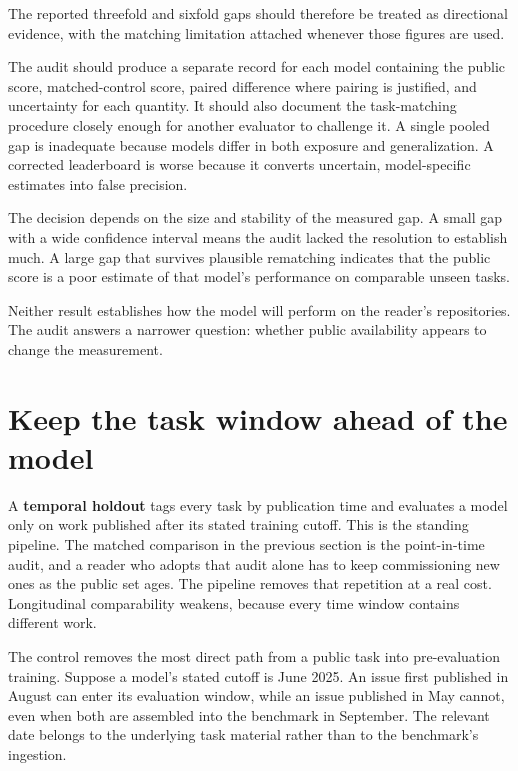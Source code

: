 The reported threefold and sixfold gaps should therefore be treated as directional evidence, with the matching limitation attached whenever those figures are used.

The audit should produce a separate record for each model containing the public score, matched-control score, paired difference where pairing is justified, and uncertainty for each quantity. It should also document the task-matching procedure closely enough for another evaluator to challenge it. A single pooled gap is inadequate because models differ in both exposure and generalization. A corrected leaderboard is worse because it converts uncertain, model-specific estimates into false precision.

The decision depends on the size and stability of the measured gap. A small gap with a wide confidence interval means the audit lacked the resolution to establish much. A large gap that survives plausible rematching indicates that the public score is a poor estimate of that model's performance on comparable unseen tasks.

Neither result establishes how the model will perform on the reader's repositories. The audit answers a narrower question: whether public availability appears to change the measurement.

\hypertarget{keep-the-task-window-ahead-of-the-model}{%
\section{Keep the task window ahead of the model}\label{keep-the-task-window-ahead-of-the-model}}

A \textbf{temporal holdout} tags every task by publication time and evaluates a model only on work published after its stated training cutoff. This is the standing pipeline. The matched comparison in the previous section is the point-in-time audit, and a reader who adopts that audit alone has to keep commissioning new ones as the public set ages. The pipeline removes that repetition at a real cost. Longitudinal comparability weakens, because every time window contains different work.

The control removes the most direct path from a public task into pre-evaluation training. Suppose a model's stated cutoff is June 2025. An issue first published in August can enter its evaluation window, while an issue published in May cannot, even when both are assembled into the benchmark in September. The relevant date belongs to the underlying task material rather than to the benchmark's ingestion.

